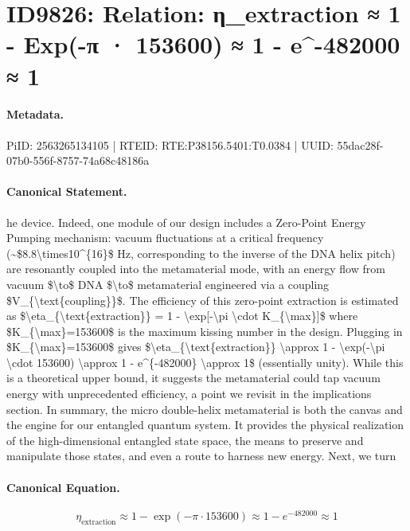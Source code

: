\section*{ID9826: Relation: η\_extraction ≈ 1 - Exp(-π · 153600) ≈ 1 - e\textasciicircum{}-482000 ≈ 1}
\paragraph{Metadata.}
PiID: 2563265134105 | RTEID: RTE:P38156.5401:T0.0384 | UUID: 55dac28f-07b0-556f-8757-74a68c48186a

\paragraph{Canonical Statement.}
he device. Indeed, one module of our design includes a Zero-Point Energy Pumping mechanism: vacuum fluctuations at a critical frequency (\textasciitilde{}\$8.8\textbackslash{}times10\textasciicircum{}\{16\}\$ Hz, corresponding to the inverse of the DNA helix pitch) are resonantly coupled into the metamaterial mode, with an energy flow from vacuum \$\textbackslash{}to\$ DNA \$\textbackslash{}to\$ metamaterial engineered via a coupling \$V\_\{\textbackslash{}text\{coupling\}\}\$. The efficiency of this zero-point extraction is estimated as \$\textbackslash{}eta\_\{\textbackslash{}text\{extraction\}\} = 1 - \textbackslash{}exp[-\textbackslash{}pi \textbackslash{}cdot K\_\{\textbackslash{}max\}]\$ where \$K\_\{\textbackslash{}max\}=153600\$ is the maximum kissing number in the design. Plugging in \$K\_\{\textbackslash{}max\}=153600\$ gives \$\textbackslash{}eta\_\{\textbackslash{}text\{extraction\}\} \textbackslash{}approx 1 - \textbackslash{}exp(-\textbackslash{}pi \textbackslash{}cdot 153600) \textbackslash{}approx 1 - e\textasciicircum{}\{-482000\} \textbackslash{}approx 1\$ (essentially unity). While this is a theoretical upper bound, it suggests the metamaterial could tap vacuum energy with unprecedented efficiency, a point we revisit in the implications section. In summary, the micro double-helix metamaterial is both the canvas and the engine for our entangled quantum system. It provides the physical realization of the high-dimensional entangled state space, the means to preserve and manipulate those states, and even a route to harness new energy. Next, we turn

\paragraph{Canonical Equation.}
\[
\eta_{\text{extraction}} \approx 1 - \exp(-\pi \cdot 153600) \approx 1 - e^{-482000} \approx 1
\]


